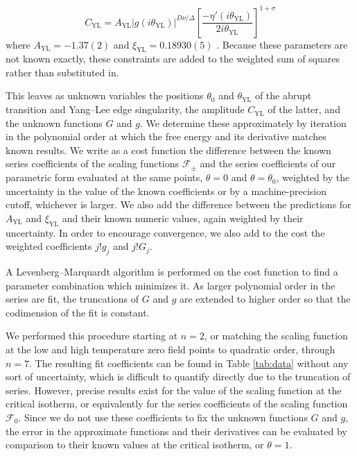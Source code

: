 \documentclass[
aps,
pre,
preprint,
longbibliography,
floatfix
]{revtex4-2}
\begin{document}
\begin{equation}
  C_\mathrm{YL}=A_\mathrm{YL}|g(i\theta_\mathrm{YL})|^{D\nu/\Delta}\left[\frac{-\eta'(i\theta_\mathrm{YL})}{2i\theta_\mathrm{YL}}\right]^{1+\sigma}
\end{equation}
where $A_\mathrm{YL}=-1.37(2)$ and $\xi_\mathrm{YL}=0.18930(5)$
\cite{Fonseca_2003_Ising}. Because these parameters are not known exactly,
these constraints are added to the weighted sum of squares rather than
substituted in.

This leaves as unknown variables the positions $\theta_0$ and
$\theta_{\mathrm{YL}}$ of the abrupt transition and Yang--Lee edge singularity,
the amplitude $C_\mathrm{YL}$ of the latter, and the unknown functions $G$ and
$g$. We determine these approximately by iteration in the polynomial order at
which the free energy and its derivative matches known results. We write as a
cost function the difference between the known series coefficients of the
scaling functions $\mathcal F_\pm$ and the series coefficients of our
parametric form evaluated at the same points, $\theta=0$ and $\theta=\theta_0$,
weighted by the uncertainty in the value of the known coefficients or by a
machine-precision cutoff, whichever is larger. We also add the difference
between the predictions for $A_\mathrm{YL}$ and $\xi_\mathrm{YL}$ and their
known numeric values, again weighted by their uncertainty. In order to
encourage convergence, we also add to the cost the weighted coefficients
$j!g_j$ and $j!G_j$.

A Levenberg--Marquardt algorithm is performed on the cost function to find a
parameter combination which minimizes it. As larger polynomial order in the
series are fit, the truncations of $G$ and $g$ are extended to higher order so
that the codimension of the fit is constant.

We performed this procedure starting at $n=2$, or matching the scaling
function at the low and high temperature zero field points to quadratic order,
through $n=7$. The resulting fit coefficients can be found in Table
\ref{tab:data} without any sort of uncertainty, which is difficult to quantify
directly due to the truncation of series. However, precise results exist for
the value of the scaling function at the critical isotherm, or equivalently for
the series coefficients of the scaling function $\mathcal F_0$. Since we do not
use these coefficients to fix the unknown functions $G$ and $g$, the error in
the approximate functions and their derivatives can be evaluated by comparison
to their known values at the critical isotherm, or $\theta=1$.
\end{document}
